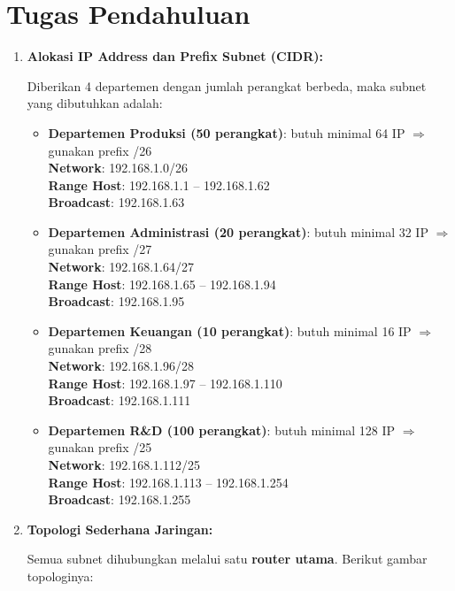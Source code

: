 \section{Tugas Pendahuluan}
\begin{enumerate}
    \item \textbf{Alokasi IP Address dan Prefix Subnet (CIDR):}
    
    Diberikan 4 departemen dengan jumlah perangkat berbeda, maka subnet yang dibutuhkan adalah:
    
    \begin{itemize}
        \item \textbf{Departemen Produksi (50 perangkat)}: butuh minimal 64 IP $\Rightarrow$ gunakan prefix /26 \\
        \textbf{Network}: 192.168.1.0/26 \\
        \textbf{Range Host}: 192.168.1.1 – 192.168.1.62 \\
        \textbf{Broadcast}: 192.168.1.63
        \item \textbf{Departemen Administrasi (20 perangkat)}: butuh minimal 32 IP $\Rightarrow$ gunakan prefix /27 \\
        \textbf{Network}: 192.168.1.64/27 \\
        \textbf{Range Host}: 192.168.1.65 – 192.168.1.94 \\
        \textbf{Broadcast}: 192.168.1.95
        \item \textbf{Departemen Keuangan (10 perangkat)}: butuh minimal 16 IP $\Rightarrow$ gunakan prefix /28 \\
        \textbf{Network}: 192.168.1.96/28 \\
        \textbf{Range Host}: 192.168.1.97 – 192.168.1.110 \\
        \textbf{Broadcast}: 192.168.1.111
        \item \textbf{Departemen R\&D (100 perangkat)}: butuh minimal 128 IP $\Rightarrow$ gunakan prefix /25 \\
        \textbf{Network}: 192.168.1.112/25 \\
        \textbf{Range Host}: 192.168.1.113 – 192.168.1.254 \\
        \textbf{Broadcast}: 192.168.1.255
    \end{itemize}
    
    \item \textbf{Topologi Sederhana Jaringan:}
    
    Semua subnet dihubungkan melalui satu \textbf{router utama}. Berikut gambar topologinya:
    

\end{enumerate}
